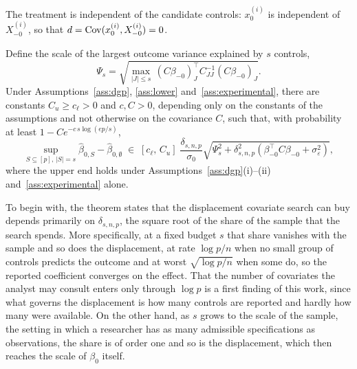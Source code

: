 
\begin{assumption}\label{ass:experimental}
The treatment is independent of the candidate controls: $x_0^{(i)}$ is
independent of $X_{-0}^{(i)}$, so that
$d = \operatorname{Cov}(x_0^{(i)}, X_{-0}^{(i)}) = 0$.
\end{assumption}

\begin{theorem}
\label{thm:experimental-matching}
Define the scale of the largest outcome variance explained by $s$
controls,
\begin{equation}\label{eq:energy-scale}
        \Psi_s
        =
        \sqrt{\max_{|J| \le s}\, (C\beta_{-0})_J^\top C_{JJ}^{-1} (C\beta_{-0})_J}.
\end{equation}
Under Assumptions~\ref{ass:dgp}, \ref{ass:lower}
and~\ref{ass:experimental}, there are constants $C_u \ge c_\ell > 0$ and
$c, C > 0$, depending only on the constants of the assumptions and not
otherwise on the covariance $C$, such that, with probability at least
$1 - C e^{-c\, s \log(ep/s)}$,
\begin{equation}\label{eq:experimental-matching}
        \sup_{S \subseteq [p],\, |S| = s} \hat \beta_{0, S}
        - \hat\beta_{0,\emptyset}
        \;\in\;
        [c_\ell,\, C_u]\;
        \frac{\delta_{s,n,p}}{\sigma_0}
        \sqrt{\Psi_s^2 + \delta_{s,n,p}^2
        \left( \beta_{-0}^\top C \beta_{-0} + \sigma_\varepsilon^2 \right)},
\end{equation}
where the upper end holds under Assumptions~\ref{ass:dgp}(i)--(ii)
and~\ref{ass:experimental} alone.
\end{theorem}

To begin with, the theorem states that the displacement covariate
search can buy depends primarily on $\delta_{s,n,p}$, the square root of
the share of the sample that the search spends. More specifically, at a
fixed budget $s$ that share vanishes with the sample and so does the
displacement, at rate $\log p / n$ when no small group of controls
predicts the outcome and at worst $\sqrt{\log p / n}$ when some do, so
the reported coefficient converges on the effect. That the number of
covariates the analyst may consult enters only through $\log p$ is a
first finding of this work, since what governs the displacement is how
many controls are reported and hardly how many were available. On the
other hand, as $s$ grows to the scale of the sample, the setting in which
a researcher has as many admissible specifications as observations, the
share is of order one and so is the displacement, which then reaches the
scale of $\beta_0$ itself.

